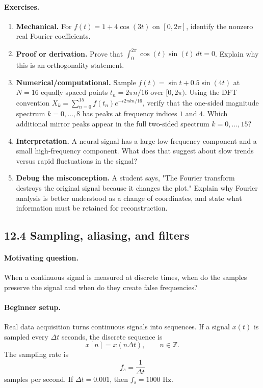 \paragraph{Exercises.}
\begin{enumerate}[label=\textbf{12.3.\arabic*.}, leftmargin=*]
\item \textbf{Mechanical.} For \(f(t)=1+4\cos(3t)\) on \([0,2\pi]\), identify the nonzero real Fourier coefficients.
\item \textbf{Proof or derivation.} Prove that \(\int_0^{2\pi}\cos(t)\sin(t)\,dt=0\). Explain why this is an orthogonality statement.
\item \textbf{Numerical/computational.} Sample \(f(t)=\sin t+0.5\sin(4t)\) at \(N=16\) equally spaced points \(t_n=2\pi n/16\) over \([0,2\pi)\). Using the DFT convention \(X_k=\sum_{n=0}^{15} f(t_n)e^{-i2\pi kn/16}\), verify that the one-sided magnitude spectrum \(k=0,\ldots,8\) has peaks at frequency indices \(1\) and \(4\). Which additional mirror peaks appear in the full two-sided spectrum \(k=0,\ldots,15\)?
\item \textbf{Interpretation.} A neural signal has a large low-frequency component and a small high-frequency component. What does that suggest about slow trends versus rapid fluctuations in the signal?
\item \textbf{Debug the misconception.} A student says, "The Fourier transform destroys the original signal because it changes the plot." Explain why Fourier analysis is better understood as a change of coordinates, and state what information must be retained for reconstruction.
\end{enumerate}

\subsection{12.4 Sampling, aliasing, and filters}

\paragraph{Motivating question.}
When a continuous signal is measured at discrete times, when do the samples preserve the signal and when do they create false frequencies?

\paragraph{Beginner setup.}
Real data acquisition turns continuous signals into sequences. If a signal \(x(t)\) is sampled every \(\Delta t\) seconds, the discrete sequence is
\[
x[n]=x(n\Delta t),
\qquad n\in\mathbb{Z}.
\]
The sampling rate is
\[
f_s=\frac{1}{\Delta t}
\]
samples per second. If \(\Delta t=0.001\), then \(f_s=1000\) Hz.

